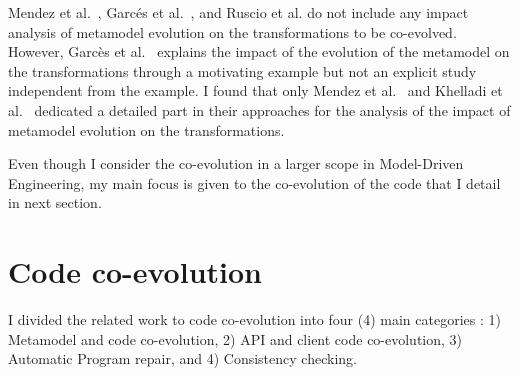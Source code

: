 Mendez et al.~\cite{mendez2010towards}, Garcés et al.~\cite{garces2014adapting}, and Ruscio et al. \cite{di2011needed} do not include any impact analysis of metamodel evolution on the transformations to be co-evolved. However, Garcès et al.~\cite{garces2014adapting} explains the impact of the evolution of the metamodel on the transformations through a motivating example but not an explicit study independent from the example. 
I found that only Mendez et al.~\cite{mendez2010towards} and Khelladi et al.~\cite{khelladi2018change} dedicated a detailed part in their approaches for the analysis of the impact of metamodel evolution on the transformations.

Even though I consider the co-evolution in a larger scope in Model-Driven Engineering, my main focus is given to the co-evolution of the code that I detail in next section.


 \section{Code co-evolution}
 \label{coevolutioncode}
 I divided the related work to code co-evolution  into four (4) main categories : 1) Metamodel and code co-evolution, 2) API and client code co-evolution, 3) Automatic Program repair, and 4) Consistency checking. 

